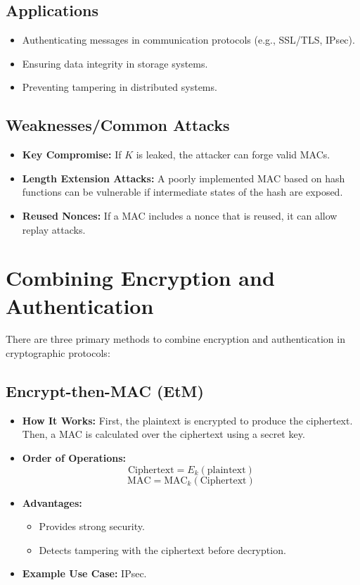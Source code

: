 \documentclass[12pt]{article}
\begin{document}
\subsection*{Applications}
\begin{itemize}
    \item Authenticating messages in communication protocols (e.g., SSL/TLS, IPsec).
    \item Ensuring data integrity in storage systems.
    \item Preventing tampering in distributed systems.
\end{itemize}

\subsection*{Weaknesses/Common Attacks}
\begin{itemize}
    \item \textbf{Key Compromise:} If \( K \) is leaked, the attacker can forge valid MACs.
    \item \textbf{Length Extension Attacks:} A poorly implemented MAC based on hash functions can be vulnerable if intermediate states of the hash are exposed.
    \item \textbf{Reused Nonces:} If a MAC includes a nonce that is reused, it can allow replay attacks.
\end{itemize}

\section*{Combining Encryption and Authentication}
There are three primary methods to combine encryption and authentication in cryptographic protocols:

\subsection*{Encrypt-then-MAC (EtM)}
\begin{itemize}
    \item \textbf{How It Works:} First, the plaintext is encrypted to produce the ciphertext. Then, a MAC is calculated over the ciphertext using a secret key.
    \item \textbf{Order of Operations:}
    \[
    \text{Ciphertext} = E_k(\text{plaintext})
    \]
    \[
    \text{MAC} = \mathrm{MAC}_k(\text{Ciphertext})
    \]
    \item \textbf{Advantages:} 
    \begin{itemize}
        \item Provides strong security.
        \item Detects tampering with the ciphertext before decryption.
    \end{itemize}
    \item \textbf{Example Use Case:} IPsec.
\end{itemize}
\end{document}
